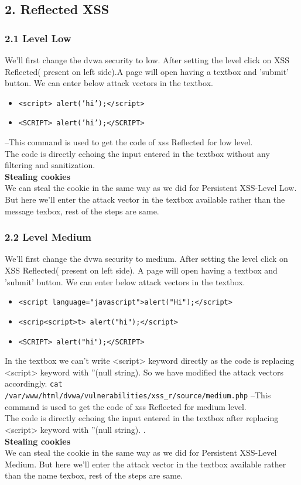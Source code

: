 \documentclass{article}
\begin{document}
\subsection*{2. Reflected XSS}
\subsubsection*{2.1 Level Low}
We'll first change the dvwa security to low. After setting the level click on XSS Reflected( present on left side).A page will open having a textbox and 'submit' button. We can enter below attack vectors in the textbox.\\
\begin{itemize}
     \item {\tt <script> alert('hi');</script>}
     \item {\tt <SCRIPT> alert('hi');</SCRIPT>}
\end{itemize}

  --This command is used to get the code of xss Reflected for low level.\\
The code is directly echoing the input entered in the textbox without any filtering and sanitization.\\
\textbf{Stealing cookies}\\
We can steal the cookie in the same way as we did for Persistent XSS-Level Low. But here we'll enter the attack vector in the textbox available rather than the message texbox, rest of the steps are same.

\subsubsection*{2.2 Level Medium}
We'll first change the dvwa security to medium. After setting the level click on XSS Reflected( present on left side). A page will open having a textbox and 'submit' button. We can enter below attack vectors in the textbox.\\
\begin{itemize}
     \item {\tt <script language="javascript">alert("Hi");</script>}
     \item {\tt <scrip<script>t> alert("hi");</script>}
     \item {\tt <SCRIPT> alert("hi");</SCRIPT>}
\end{itemize}

In the textbox we can't write <script> keyword directly as the code is replacing <script> keyword with ''(null string). So we have modified the attack vectors accordingly.
{\tt cat /var/www/html/dvwa/vulnerabilities/xss\_r/source/medium.php} --This command is used to get the code of xss Reflected for medium level.\\
The code is directly echoing the input entered in the textbox after replacing <script> keyword with ''(null string). .\\
\textbf{Stealing cookies}\\
We can steal the cookie in the same way as we did for Persistent XSS-Level Medium. But here we'll enter the attack vector in the textbox available rather than the name texbox, rest of the steps are same.
\end{document}
